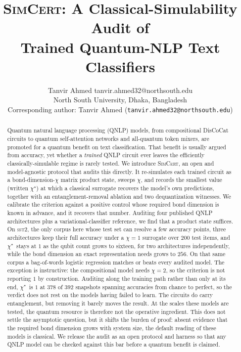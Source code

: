 \documentclass[10pt]{article}
\title{\textsc{SimCert}: A Classical-Simulability Audit of\\ Trained Quantum-NLP Text Classifiers}
\author{\name Tanvir Ahmed \email tanvir.ahmed32@northsouth.edu \\
       \addr North South University, Dhaka, Bangladesh \\
       \AND
       \addr Corresponding author: Tanvir Ahmed (\texttt{tanvir.ahmed32@northsouth.edu})}
\newcommand{\chistar}{\ensuremath{\chi^\star}}
\begin{document}
\maketitle

\begin{abstract}
Quantum natural language processing (QNLP) models, from compositional DisCoCat circuits to
quantum self-attention networks and all-quantum token mixers, are promoted for a quantum benefit
on text classification. That benefit is usually argued from accuracy, yet whether a
\emph{trained} QNLP circuit ever leaves the efficiently classically-simulable regime is rarely
tested. We introduce \textsc{SimCert}, an open and model-agnostic protocol that audits this
directly. It re-simulates each trained circuit as a bond-dimension-$\chi$ matrix product state,
sweeps $\chi$, and records the smallest value (written \chistar) at which a classical surrogate
recovers the model's own predictions, together with an entanglement-removal ablation and two
dequantization witnesses. We calibrate the criterion against a positive control whose required
bond dimension is known in advance, and it recovers that number. Auditing four published QNLP
architectures plus a variational-classifier reference, we find that a product state suffices. On
\textsc{sst2}, the only corpus here whose test set can resolve a few accuracy points, three
architectures keep their full accuracy under a $\chi{=}1$ surrogate over $200$ test items, and
\chistar\ stays at $1$ as the qubit count grows to sixteen, for two architectures independently,
while the bond dimension an exact representation needs grows to $256$. On that same corpus a
bag-of-words logistic regression matches or beats every audited model. The exception is
instructive: the compositional model needs $\chi{=}2$, so the criterion is not reporting $1$ by
construction. Auditing along the training path rather than only at its end, \chistar\ is $1$ at
$378$ of $392$ snapshots spanning accuracies from chance to perfect, so the verdict does not rest
on the models having failed to learn. The circuits do carry entanglement, but removing it barely
moves the result. At the scales these models are tested, the quantum resource is therefore not the
operative ingredient. This does not settle the asymptotic question, but it shifts the burden of
proof: absent evidence that the required bond dimension grows with system size, the default
reading of these models is classical. We release the audit as an open protocol and harness so that
any QNLP model can be checked against this bar before a quantum benefit is claimed.
\end{abstract}
\end{document}

